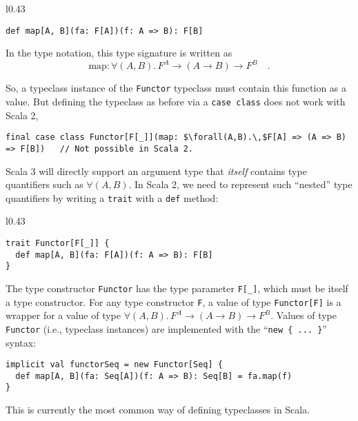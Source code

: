 \begin{wrapfigure}{l}{0.43\columnwidth}%
\vspace{-0.75\baselineskip}
\begin{lstlisting}
def map[A, B](fa: F[A])(f: A => B): F[B]
\end{lstlisting}
\vspace{-0.05\baselineskip}
\end{wrapfigure}%

\noindent In the type notation, this type signature is written as\vspace{-0.45\baselineskip}
\[
\text{map}:\forall(A,B).\,F^{A}\rightarrow\left(A\rightarrow B\right)\rightarrow F^{B}\quad.
\]
\vspace{-1.5\baselineskip}

\noindent So, a typeclass instance of the \lstinline!Functor! typeclass
must contain this function as a value. But defining the typeclass
as before via a \lstinline!case class! does not work with Scala 2,
\begin{lstlisting}[mathescape=true]
final case class Functor[F[_]](map: $\forall(A,B).\,$F[A] => (A => B) => F[B])   // Not possible in Scala 2.
\end{lstlisting}
Scala 3 will directly support an argument type that \emph{itself}
contains type quantifiers such as $\forall(A,B)$. In Scala 2, we
need to represent such \textsf{``}nested\textsf{''} type quantifiers by writing a
\lstinline!trait! with a \lstinline!def! method:

\begin{wrapfigure}{l}{0.43\columnwidth}%
\vspace{-0.75\baselineskip}
\begin{lstlisting}
trait Functor[F[_]] {
  def map[A, B](fa: F[A])(f: A => B): F[B]
}
\end{lstlisting}
\vspace{-0.75\baselineskip}
\end{wrapfigure}%

\noindent The type constructor \lstinline!Functor! has the type parameter
\lstinline!F[_]!, which must be itself a type constructor. For any
type constructor \lstinline!F!, a value of type \lstinline!Functor[F]!
is a wrapper for a value of type $\forall(A,B).\,F^{A}\rightarrow\left(A\rightarrow B\right)\rightarrow F^{B}$.
Values of type \lstinline!Functor! (i.e., typeclass instances) are
implemented with the \textsf{``}\lstinline!new { ... }!\textsf{''} syntax:
\begin{lstlisting}
implicit val functorSeq = new Functor[Seq] {
  def map[A, B](fa: Seq[A])(f: A => B): Seq[B] = fa.map(f)
}
\end{lstlisting}
This is currently the most common way of defining typeclasses in Scala.

